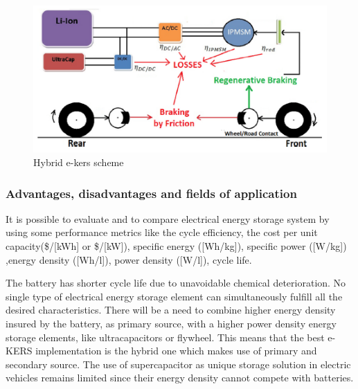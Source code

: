 \documentclass[11pt]{article}
\begin{document}
\begin{figure}[H]
	\centering
	\includegraphics[width=.6\textwidth]{Images/State_of_the_art/Electric_KERS_powerflow.PNG}
	\caption{Hybrid e-kers scheme}
	\label{ekersschemepowerflow}
\end{figure}


\subsubsection{Advantages, disadvantages and fields of application}

It is possible to evaluate and to compare electrical energy storage system by using some performance metrics like the cycle efficiency, the cost per unit capacity(\$/[kWh] or \$/[kW]), specific energy ([Wh/kg]), specific power ([W/kg]) ,energy density ([Wh/l]), power density ([W/l]), cycle life. 

The battery has shorter cycle life due to unavoidable chemical deterioration. No single type of electrical energy storage element can simultaneously fulfill all the desired characteristics. There will be a need to combine higher energy density insured by the battery, as primary source, with a higher power density energy storage elements, like ultracapacitors or flywheel. This means that the best e-KERS implementation is the hybrid one which makes use of primary and secondary source. The use of supercapacitor as unique storage solution in electric vehicles remains limited since their energy density cannot compete with batteries. 
\end{document}
